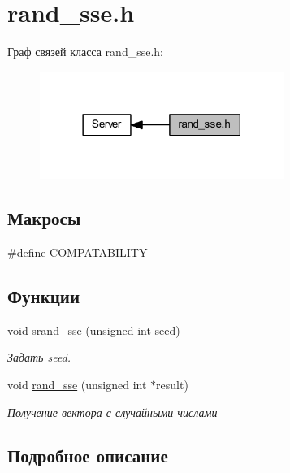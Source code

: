 \hypertarget{group__rand__sseh}{}\section{rand\+\_\+sse.\+h}
\label{group__rand__sseh}
Граф связей класса rand\+\_\+sse.\+h\+:
\nopagebreak
\begin{figure}[H]
\begin{center}
\leavevmode
\includegraphics[width=225pt]{group__rand__sseh}
\end{center}
\end{figure}
\subsection*{Макросы}
\begin{DoxyCompactItemize}
\item 
\#define \mbox{\hyperlink{group__rand__sseh_ga63986cff5b50815b213aa8d6a9ab8768}{C\+O\+M\+P\+A\+T\+A\+B\+I\+L\+I\+TY}}
\end{DoxyCompactItemize}
\subsection*{Функции}
\begin{DoxyCompactItemize}
\item 
void \mbox{\hyperlink{group__rand__sseh_ga80db1a2aa7de7edf52b9c60e101d556f}{srand\+\_\+sse}} (unsigned int seed)
\begin{DoxyCompactList}\small\item\em Задать seed. \end{DoxyCompactList}\item 
void \mbox{\hyperlink{group__rand__sseh_gab7ae3ab6c8fb3e31548413dd0154db7d}{rand\+\_\+sse}} (unsigned int $\ast$result)
\begin{DoxyCompactList}\small\item\em Получение вектора с случайными числами \end{DoxyCompactList}\end{DoxyCompactItemize}


\subsection{Подробное описание}


